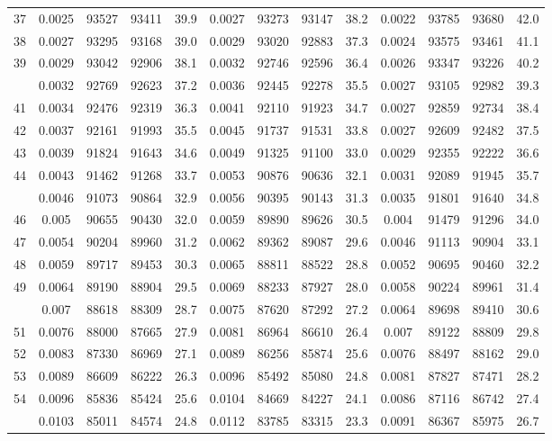\documentclass[
  14pt,
]{article}
\begin{document}
\begin{longtable}[t]{lcccccccccccc}
37 & 0.0025 & 93527 & 93411 & 39.9 & 0.0027 & 93273 & 93147 & 38.2 & 0.0022 & 93785 & 93680 & 42.0\\
38 & 0.0027 & 93295 & 93168 & 39.0 & 0.0029 & 93020 & 92883 & 37.3 & 0.0024 & 93575 & 93461 & 41.1\\
39 & 0.0029 & 93042 & 92906 & 38.1 & 0.0032 & 92746 & 92596 & 36.4 & 0.0026 & 93347 & 93226 & 40.2\\
\addlinespace
40 & 0.0032 & 92769 & 92623 & 37.2 & 0.0036 & 92445 & 92278 & 35.5 & 0.0027 & 93105 & 92982 & 39.3\\
41 & 0.0034 & 92476 & 92319 & 36.3 & 0.0041 & 92110 & 91923 & 34.7 & 0.0027 & 92859 & 92734 & 38.4\\
42 & 0.0037 & 92161 & 91993 & 35.5 & 0.0045 & 91737 & 91531 & 33.8 & 0.0027 & 92609 & 92482 & 37.5\\
43 & 0.0039 & 91824 & 91643 & 34.6 & 0.0049 & 91325 & 91100 & 33.0 & 0.0029 & 92355 & 92222 & 36.6\\
44 & 0.0043 & 91462 & 91268 & 33.7 & 0.0053 & 90876 & 90636 & 32.1 & 0.0031 & 92089 & 91945 & 35.7\\
\addlinespace
45 & 0.0046 & 91073 & 90864 & 32.9 & 0.0056 & 90395 & 90143 & 31.3 & 0.0035 & 91801 & 91640 & 34.8\\
46 & 0.005 & 90655 & 90430 & 32.0 & 0.0059 & 89890 & 89626 & 30.5 & 0.004 & 91479 & 91296 & 34.0\\
47 & 0.0054 & 90204 & 89960 & 31.2 & 0.0062 & 89362 & 89087 & 29.6 & 0.0046 & 91113 & 90904 & 33.1\\
48 & 0.0059 & 89717 & 89453 & 30.3 & 0.0065 & 88811 & 88522 & 28.8 & 0.0052 & 90695 & 90460 & 32.2\\
49 & 0.0064 & 89190 & 88904 & 29.5 & 0.0069 & 88233 & 87927 & 28.0 & 0.0058 & 90224 & 89961 & 31.4\\
\addlinespace
50 & 0.007 & 88618 & 88309 & 28.7 & 0.0075 & 87620 & 87292 & 27.2 & 0.0064 & 89698 & 89410 & 30.6\\
51 & 0.0076 & 88000 & 87665 & 27.9 & 0.0081 & 86964 & 86610 & 26.4 & 0.007 & 89122 & 88809 & 29.8\\
52 & 0.0083 & 87330 & 86969 & 27.1 & 0.0089 & 86256 & 85874 & 25.6 & 0.0076 & 88497 & 88162 & 29.0\\
53 & 0.0089 & 86609 & 86222 & 26.3 & 0.0096 & 85492 & 85080 & 24.8 & 0.0081 & 87827 & 87471 & 28.2\\
54 & 0.0096 & 85836 & 85424 & 25.6 & 0.0104 & 84669 & 84227 & 24.1 & 0.0086 & 87116 & 86742 & 27.4\\
\addlinespace
55 & 0.0103 & 85011 & 84574 & 24.8 & 0.0112 & 83785 & 83315 & 23.3 & 0.0091 & 86367 & 85975 & 26.7\\

\end{longtable}
\end{document}
